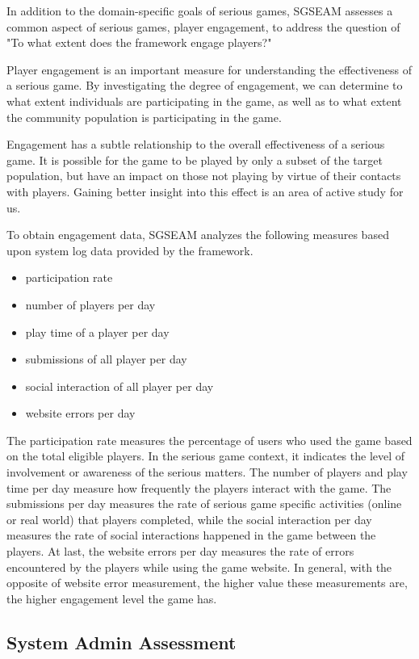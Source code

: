 \documentclass[11pt]{article}
\begin{document}
In addition to the domain-specific goals of serious games, SGSEAM assesses a common
aspect of serious games, player engagement, to address the question of "To what extent does the
framework engage players?"

Player engagement is an important measure for understanding the effectiveness of a serious game.
By investigating the degree of engagement, we can determine to what extent individuals are
participating in the game, as well as to what extent the community population is participating in
the game.

Engagement has a subtle relationship to the overall effectiveness of a serious game. It is
possible for the game to be played by only a subset of the target population, but
have an impact on those not playing by virtue of their contacts with players. Gaining
better insight into this effect is an area of active study for us. 

To obtain engagement data, SGSEAM analyzes the following measures
based upon system log data provided by the framework.

\begin{itemize}
\item participation rate
\item number of players per day
\item play time of a player per day
\item submissions of all player per day
\item social interaction of all player per day
\item website errors per day
\end{itemize}

The participation rate measures the percentage of users who used the game based on the total
eligible players. In the serious game context, it indicates the level of involvement or awareness
of the serious matters. The number of players and play time per day measure how frequently the
players interact with the game. The submissions per day measures the rate of serious game
specific activities (online or real world) that players completed, while the social interaction
per day measures the rate of social interactions happened in the game between the players. At
last, the website errors per day measures the rate of errors encountered by the players while
using the game website. In general, with the opposite of website error measurement, the higher
value these measurements are, the higher engagement level the game has.

\subsection{System Admin Assessment}
\end{document}
